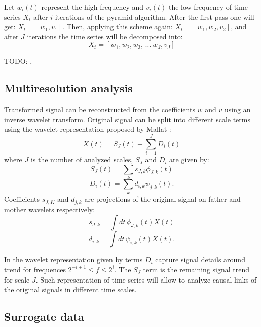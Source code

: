 Let $w_i(t)$ represent the high frequency and $v_i(t)$ the low frequency of time series $X_t$ after $i$ iterations of the pyramid algorithm.
After the first pass one will get: $X_t = [w_1, v_1]$.
Then, applying this scheme again: $X_t = [w_1, w_2, v_2]$, and after $J$ iterations the time series will be decomposed into:
\begin{equation}
	X_t = [w_1, w_2, w_3, \, \dots \, w_J, v_J]
\end{equation}



TODO: \cite{practical-wavelet}, 

\subsection{Multiresolution analysis}
Transformed signal can be reconstructed from the coefficients $w$ and $v$ using an inverse wavelet transform.
Original signal can be split into different scale terms using the wavelet representation proposed by Mallat \cite{mallat1989}:
\begin{equation} \label{eq:decomposed}
	X(t) = S_J(t) + \sum_{i=1}^{J} D_i(t)
\end{equation}
where $J$ is the number of analyzed scales, $S_J$ and $D_i$ are given by:
\begin{equation}
	S_J(t) = \sum_k s_{J,k} \phi_{J,k}(t)
\end{equation}
\begin{equation}
	D_i(t) = \sum_k d_{i,k} \psi_{j,k}(t).
\end{equation}
Coefficients $s_{J,K}$ and $d_{j,k}$ are projections of the original signal on father and mother wavelets respectively:
\begin{equation}
	s_{J,k} = \int dt \, \phi_{J,k}(t) X(t)
\end{equation}
\begin{equation}
	d_{i,k} = \int dt \, \psi_{i,k}(t) X(t).
\end{equation}

In the wavelet representation given by  terms $D_i$ capture signal details around trend for frequences $2^{-i+1} \leq f \leq 2^{i}$.
The $S_J$ term is the remaining signal trend for scale $J$.
Such representation of time series will allow to analyze causal links of the original signals in different time scales.

\subsection{Surrogate data}

